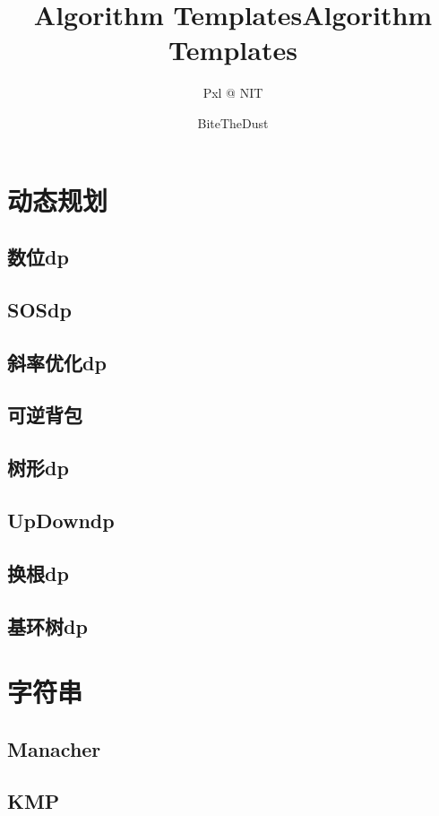 \documentclass[10pt,a4paper]{article}
\title{Algorithm Templates}
\author{Pxl @ NIT}
\begin{document}
\title{Algorithm Templates}
\author {BiteTheDust}
\maketitle
\tableofcontents
\newpage
\section{动态规划}
\subsection{数位dp}

\subsection{SOSdp}

\subsection{斜率优化dp}

\subsection{可逆背包}

\subsection{树形dp}

\subsection{UpDowndp}

\subsection{换根dp}

\subsection{基环树dp}

\section{字符串}
\subsection{Manacher}

\subsection{KMP}

\end{document}
